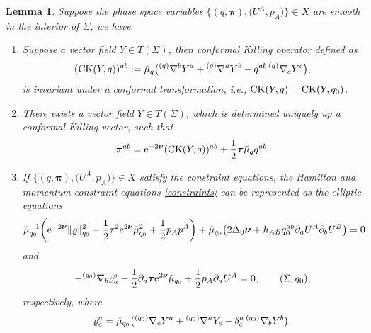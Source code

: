 \documentclass[pdftex]{sigma}
\def\ptl{\partial}%
\def\mbo#1{\boldsymbol{#1}}%
\def\grad{{\nabla}}%
\newcommand{\leftexp}[2]{{\vphantom{#2}}^{#1}{#2}}
\def\halb{\frac{1}{2}}%
\numberwithin{equation}{section}
\newtheorem{Lemma}[Theorem]{Lemma}
\begin{document}
\begin{Lemma}
Suppose the phase space variables $ \bigl\{ (q, \mbo{\pi}), \bigl(U^A, p_A\bigr) \bigr\} \in X$ are smooth in the interior of $\Sigma$, we have
\begin{enumerate}\itemsep=0pt
\item[$(1)$] Suppose a vector field $Y \in T (\Sigma)$, then conformal Killing operator defined as
\begin{align*}
({\rm CK}(Y, q))^{ab}:= \bar{\mu}_q \bigl(\leftexp{(q)}{\grad}^b Y^a + \leftexp{(q)}{\grad}^a Y^b - q^{ab} \, \leftexp{(q)}{\grad}_c Y^c\bigr),
\end{align*}
is invariant under a conformal transformation, i.e., ${\rm CK} (Y,q) = {\rm CK}(Y, q_0)$.
\item[$(2)$] There exists a vector field $Y \in T(\Sigma)$, which is determined uniquely up a conformal Killing vector, such that
\begin{align*}
\mbo{\pi}^{ab}= {\rm e}^{-2 \mbo{\nu}} ({\rm CK}(Y, q))^{ab} + \halb \mbo{\tau} \bar{\mu}_q q^{ab}.
\end{align*}
\item[$(3)$] If $ \bigl\{ (q, \mbo{\pi}), \bigl(U^A, p_A\bigr) \bigr\} \in X$ satisfy the constraint equations, the Hamilton and momentum constraint equations \eqref{constraints} can be represented as the elliptic equations
\begin{align*}
\bar{\mu}^{-1}_{q_0} \biggl({\rm e}^{-2 \mbo{\nu}} \Vert \varrho \Vert^2_{q_0} - \halb \tau^2 {\rm e}^{2 \mbo{\nu}} \bar{\mu}^2_{q_0} + \halb p_A p^A\biggr)
+ \bar{\mu}_{q_0} \bigl(2 \Delta_0 \mbo{\nu} + h_{AB} q_0^{ab} \ptl_a U^A \ptl_b U^B\bigr) =0
\end{align*}
and
\[
-\leftexp{(q_0)}{\grad}_b \varrho^b_a - \halb \ptl_a \mbo{\tau} {\rm e}^{2 \mbo{\nu}} \bar{\mu}_{q_0} + \halb p_A \ptl_a U^A=0, \qquad (\Sigma, q_0),
\]
respectively, where
\begin{align}\label{varrho-def}
\varrho^a_c= \bar{\mu}_{q_0} \bigl(\leftexp{(q_0)}{\grad}_c Y^a + \leftexp{(q_0)}{\grad}^a Y_c - \delta^a_c \, \leftexp{(q_0)}{\grad}_b Y^b\bigr).
\end{align}
\end{enumerate}
\end{Lemma}
\end{document}
